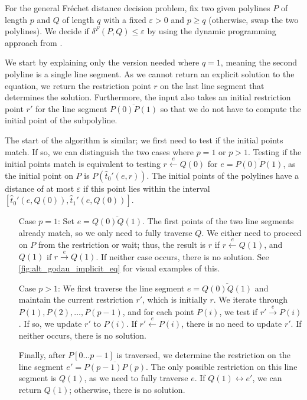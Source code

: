 For the general Fréchet distance decision problem, fix two given polylines \(P\) of length \(p\) and \(Q\) of length \(q\) with a fixed \(\varepsilon > 0\) and \(p \geq q\) (otherwise, swap the two polylines). We decide if \(\delta^F(P, Q) \leq \varepsilon\) by using the dynamic programming approach from \citeauthor{computing_the_frechet_distance_between_two_polygonal_curves}.

We start by explaining only the version needed where \(q = 1\), meaning the second polyline is a single line segment. As we cannot return an explicit solution to the equation, we return the restriction point \(r\) on the last line segment that determines the solution. Furthermore, the input also takes an initial restriction point \(r'\) for the line segment \(\overline{P(0)P(1)}\) so that we do not have to compute the initial point of the subpolyline.

The start of the algorithm is similar; we first need to test if the initial points match. If so, we can distinguish the two cases where \(p = 1\) or \(p > 1\). Testing if the initial points match is equivalent to testing \(r \overset e\leftarrow Q(0)\) for \(e = \overline{P(0)P(1)}\), as the initial point on \(P\) is \(P(\hat t_0'(e, r))\). The initial points of the polylines have a distance of at most \(\varepsilon\) if this point lies within the interval \([\hat t_0'(e, Q(0)), \hat t_1'(e, Q(0))]\).

\begin{itemize}
  \item[Case \(p = 1\): ] Set \(e = \overline{Q(0)Q(1)}\). The first points of the two line segments already match, so we only need to fully traverse \(Q\). We either need to proceed on \(P\) from the restriction or wait; thus, the result is \(r\) if \(r \overset e\leftarrow Q(1)\), and \(Q(1)\) if \(r \overset e\rightarrow Q(1)\). If neither case occurs, there is no solution.
    See \cref{fig:alt_godau_implicit_eq} for visual examples of this.
  \item[Case \(p > 1\): ] We first traverse the line segment \(e = \overline{Q(0)Q(1)}\) and maintain the current restriction \(r'\), which is initially \(r\). We iterate through \(P(1), P(2), \dots, P(p-1)\), and for each point \(P(i)\), we test if \(r' \overset e\rightarrow P(i)\). If so, we update \(r'\) to \(P(i)\). If \(r' \overset e\leftarrow P(i)\), there is no need to update \(r'\). If neither occurs, there is no solution.

    Finally, after \(P[0\dots p-1]\) is traversed, we determine the restriction on the line segment \(e'=\overline{P(p-1)P(p)}\). The only possible restriction on this line segment is \(Q(1)\), as we need to fully traverse \(e\). If \(Q(1) \leftrightarrow e'\), we can return \(Q(1)\); otherwise, there is no solution.
\end{itemize}

